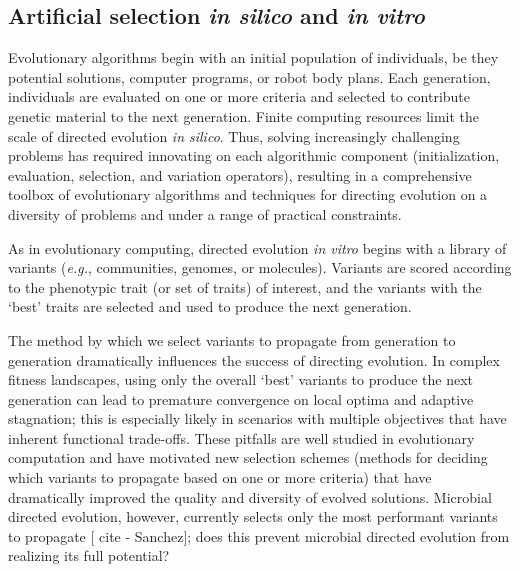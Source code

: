 \subsection*{Artificial selection \textit{in silico} and \textit{in vitro}}
\vspace{-0.5em}

Evolutionary algorithms begin with an initial population of individuals, be they  potential solutions, computer programs, or robot body plans. 
Each generation, individuals are evaluated on one or more criteria and selected to contribute genetic material to the next generation.
Finite computing resources limit the scale of directed evolution \textit{in silico}. 
Thus, solving increasingly challenging problems has required innovating on each algorithmic component (initialization, evaluation, selection, and variation operators), resulting in a comprehensive toolbox of evolutionary algorithms and techniques for directing evolution on a diversity of problems and under a range of practical constraints.

As in evolutionary computing, directed evolution \textit{in vitro} begins with a library of variants (\textit{e.g.}, communities, genomes, or molecules). 
Variants are scored according to the phenotypic trait (or set of traits) of interest, and
the variants with the `best' traits are selected and used to produce the next generation.

The method by which we select variants to propagate from generation to generation dramatically influences the success of directing evolution. 
In complex fitness landscapes, using only the overall `best' variants to produce the next generation can lead to premature convergence on local optima and adaptive stagnation; 
this is especially likely in scenarios with multiple objectives that have inherent functional trade-offs.
These pitfalls are well studied in evolutionary computation and have 
motivated new selection schemes (methods for deciding which variants to propagate based on one or more criteria) that have dramatically improved the quality and diversity of evolved solutions.
Microbial directed evolution, however, currently selects only the most performant variants to propagate [ cite - Sanchez]; does this prevent microbial directed evolution from realizing its full potential?

